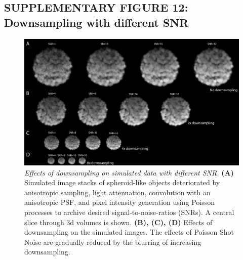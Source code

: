 \documentclass[]{spie}  %
\begin{document}
\subsection*{SUPPLEMENTARY FIGURE 12: Downsampling with different SNR}
\vspace{1mm}
\begin{figure}[h!]
\includegraphics[width=\textwidth]{fig-downsampling.jpg}
\vspace{-2.0mm}
\caption{\hspace{-0.5mm} \emph{Effects of downsampling on simulated data with different SNR.} \textbf{(A)} Simulated image stacks of spheroid-like objects deteriorated by anisotropic sampling, light attenuation, convolution with an anisotropic PSF, and pixel intensity generation using Poisson processes to archive desired signal-to-noise-ratios (SNRs). A central slice through 3d volumes is shown. \textbf{(B), (C), (D)} Effects of downsampling on the simulated images. The effects of Poisson Shot Noise are gradually reduced by the blurring of increasing downsampling.
}
\label{fig:sup-fig-downsampling}
\end{figure}

\pagebreak
\end{document}
